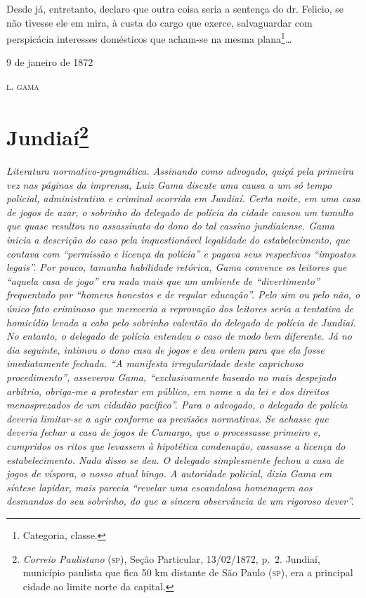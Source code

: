 {\begin{flushright}
Desde já, entretanto, declaro que outra coisa seria a sentença do dr.
Felicio, se não tivesse ele em mira, à custa do cargo que exerce,
salvaguardar com perspicácia interesses domésticos que acham-se na mesma
plana\footnote{ Categoria, classe.}\ldots{}

\begin{flushright}
9 de janeiro de 1872

\textsc{l. gama}
\end{flushright}

\chapter{Jundiaí\footnote{\emph{Correio Paulistano} (\textsc{sp}), Seção Particular,
  13/02/1872, p.~2. Jundiaí, município paulista que fica 50 km distante
  de São Paulo (\textsc{sp}), era a principal cidade ao limite norte da capital.} }%

\begin{didascalia}
\emph{Literatura normativo-pragmática. Assinando como advogado, quiçá
pela primeira vez nas páginas da imprensa, Luiz Gama discute uma causa a
um só tempo policial, administrativa e criminal ocorrida em Jundiaí.
Certa noite, em uma casa de jogos de azar, o sobrinho do delegado de
polícia da cidade causou um tumulto que quase resultou no assassinato do
dono do tal cassino jundiaiense. Gama inicia a descrição do caso pela
inquestionável legalidade do estabelecimento, que contava com ``permissão
e licença da polícia'' e pagava seus respectivos ``impostos legais''. Por
pouco, tamanha habilidade retórica, Gama convence os leitores que
``aquela casa de jogo'' era nada mais que um ambiente de ``divertimento''
frequentado por ``homens honestos e de regular educação''. Pelo sim ou
pelo não, o único fato criminoso que mereceria a reprovação dos leitores
seria a tentativa de homicídio levada a cabo pelo sobrinho valentão do
delegado de polícia de Jundiaí. No entanto, o delegado de polícia
entendeu o caso de modo bem diferente. Já no dia seguinte, intimou o
dono casa de jogos e deu ordem para que ela fosse imediatamente fechada.
``A manifesta irregularidade deste caprichoso procedimento'', asseverou
Gama, ``exclusivamente baseado no mais despejado arbítrio, obriga-me a
protestar em público, em nome a da lei e dos direitos menosprezados de
um cidadão pacífico''. Para o advogado, o delegado de polícia deveria
limitar-se a agir conforme as previsões normativas. Se achasse que
deveria fechar a casa de jogos de Camargo, que o processasse primeiro e,
cumpridos os ritos que levassem à hipotética condenação, cassasse a
licença do estabelecimento. Nada disso se deu. O delegado simplesmente
fechou a casa de jogos de víspora, o nosso atual bingo. A autoridade
policial, dizia Gama em síntese lapidar, mais parecia ``revelar uma
escandalosa homenagem aos desmandos do seu sobrinho, do que a sincera
observância de um rigoroso dever''.}
\end{didascalia}


\end{flushright}}
